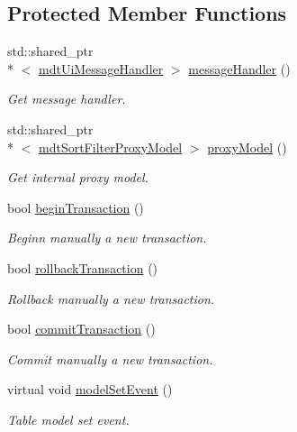 \subsection*{Protected Member Functions}
\begin{DoxyCompactItemize}
\item 
std\-::shared\-\_\-ptr\\*
$<$ \hyperlink{classmdt_ui_message_handler}{mdt\-Ui\-Message\-Handler} $>$ \hyperlink{classmdt_abstract_sql_table_controller_a6385e63f6dbfe5ed5eec9d2e3fffe896}{message\-Handler} ()
\begin{DoxyCompactList}\small\item\em Get message handler. \end{DoxyCompactList}\item 
std\-::shared\-\_\-ptr\\*
$<$ \hyperlink{classmdt_sort_filter_proxy_model}{mdt\-Sort\-Filter\-Proxy\-Model} $>$ \hyperlink{classmdt_abstract_sql_table_controller_a5d1fe79819723544c9985faea8ea3857}{proxy\-Model} ()
\begin{DoxyCompactList}\small\item\em Get internal proxy model. \end{DoxyCompactList}\item 
bool \hyperlink{classmdt_abstract_sql_table_controller_ad262dacf15c09cc04057d4e98fff2a0e}{begin\-Transaction} ()
\begin{DoxyCompactList}\small\item\em Beginn manually a new transaction. \end{DoxyCompactList}\item 
bool \hyperlink{classmdt_abstract_sql_table_controller_a74247d8bbc431f1bb16b29978080b9d1}{rollback\-Transaction} ()
\begin{DoxyCompactList}\small\item\em Rollback manually a new transaction. \end{DoxyCompactList}\item 
bool \hyperlink{classmdt_abstract_sql_table_controller_ac529dd23135fc62502ba820548b2ceec}{commit\-Transaction} ()
\begin{DoxyCompactList}\small\item\em Commit manually a new transaction. \end{DoxyCompactList}\item 
virtual void \hyperlink{classmdt_abstract_sql_table_controller_aeb331584e8cdba27e4950fc27857e52b}{model\-Set\-Event} ()
\begin{DoxyCompactList}\small\item\em Table model set event. \end{DoxyCompactList}\item 

\end{DoxyCompactItemize}
